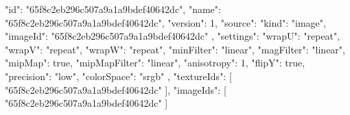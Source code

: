 {
  "id": "65f8c2eb296c507a9a1a9bdef40642dc",
  "name": "65f8c2eb296c507a9a1a9bdef40642dc",
  "version": 1,
  "source": {
    "kind": "image",
    "imageId": "65f8c2eb296c507a9a1a9bdef40642dc"
  },
  "settings": {
    "wrapU": "repeat",
    "wrapV": "repeat",
    "wrapW": "repeat",
    "minFilter": "linear",
    "magFilter": "linear",
    "mipMap": true,
    "mipMapFilter": "linear",
    "anisotropy": 1,
    "flipY": true,
    "precision": "low",
    "colorSpace": "srgb"
  },
  "textureIds": [
    "65f8c2eb296c507a9a1a9bdef40642dc"
  ],
  "imageIds": [
    "65f8c2eb296c507a9a1a9bdef40642dc"
  ]
}
